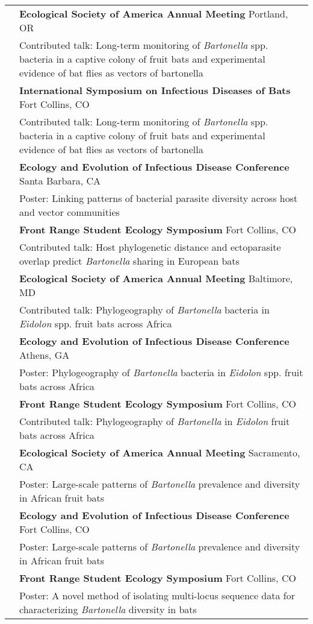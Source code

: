 \documentclass[letterpaper]{deedy-resume} %
\begin{document}
\begin{tabular}{>{\raggedright\arraybackslash}p{2cm}p{16cm}}
2017 & \textbf{Ecological Society of America Annual Meeting} Portland, OR\\
	& Contributed talk: Long-term monitoring of \textit{Bartonella} spp. bacteria in a captive colony of fruit bats and experimental evidence of bat flies as vectors of bartonella\\

2017 & \textbf{International Symposium on Infectious Diseases of Bats} Fort Collins, CO\\
	& Contributed talk: Long-term monitoring of \textit{Bartonella} spp. bacteria in a captive colony of fruit bats and experimental evidence of bat flies as vectors of bartonella\\
	
2017 & \textbf{Ecology and Evolution of Infectious Disease Conference} Santa Barbara, CA\\
	& Poster: Linking patterns of bacterial parasite diversity across host and vector communities\\

2017 & \textbf{Front Range Student Ecology Symposium} Fort Collins, CO\\
	& Contributed talk: Host phylogenetic distance and ectoparasite overlap predict \textit{Bartonella} sharing in European bats\\

2015 & \textbf{Ecological Society of America Annual Meeting} Baltimore, MD\\
	& Contributed talk: Phylogeography of \textit{Bartonella} bacteria in \textit{Eidolon} spp. fruit bats across Africa\\
	
2015 & \textbf{Ecology and Evolution of Infectious Disease Conference} Athens, GA\\
	& Poster: Phylogeography of \textit{Bartonella} bacteria in \textit{Eidolon} spp. fruit bats across Africa\\
	
2015 & \textbf{Front Range Student Ecology Symposium} Fort Collins, CO\\
	& Contributed talk: Phylogeography of \textit{Bartonella} in \textit{Eidolon} fruit bats across Africa\\

2014 & \textbf{Ecological Society of America Annual Meeting} Sacramento, CA\\
	& Poster: Large-scale patterns of \textit{Bartonella} prevalence and diversity in African fruit bats\\

2014 & \textbf{Ecology and Evolution of Infectious Disease Conference} Fort Collins, CO\\
	& Poster: Large-scale patterns of \textit{Bartonella} prevalence and diversity in African fruit bats\\

2014 & \textbf{Front Range Student Ecology Symposium} Fort Collins, CO\\
	& Poster: A novel method of isolating multi-locus sequence data for characterizing \textit{Bartonella} diversity in bats\\

\end{tabular}
\end{document}
